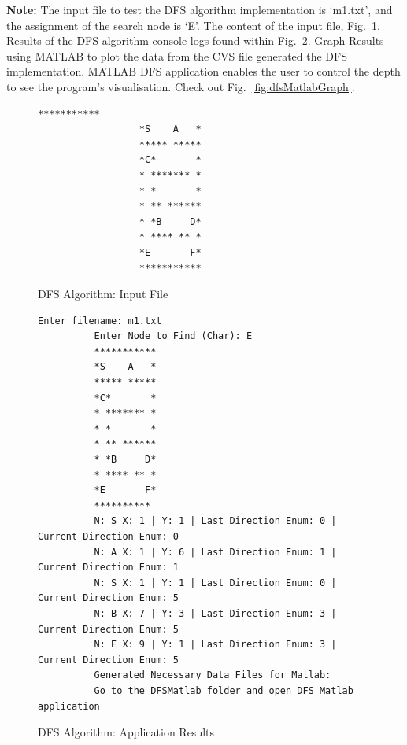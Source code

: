 \documentclass[conference]{IEEEtran}
\begin{document}
      \textbf{Note:} The input file to test the DFS algorithm implementation is ‘m1.txt’, and the assignment of the search node is ‘E’. The content of the input file, Fig.~\ref{lstlisting:dfsInput}. Results of the DFS algorithm console logs found within Fig.~\ref{lstlisting:dfsApplicationResults}. Graph Results using MATLAB to plot the data from the CVS file generated the DFS implementation. MATLAB DFS application enables the user to control the depth to see the program's visualisation. Check out Fig.~\ref{fig:dfsMatlabGraph}.
      \begin{figure}[h]
        \begin{lstlisting}[columns=fixed]
                  ***********
                  *S    A   *
                  ***** *****
                  *C*       *
                  * ******* *
                  * *       *
                  * ** ******
                  * *B     D*
                  * **** ** *
                  *E       F*
                  ***********
        \end{lstlisting}
        \caption{DFS Algorithm: Input File}
        \label{lstlisting:dfsInput}
      \end{figure}

      \begin{figure}[ht]
        \begin{lstlisting}[columns=fixed]
          Enter filename: m1.txt
          Enter Node to Find (Char): E
          ***********
          *S    A   *
          ***** *****
          *C*       *
          * ******* *
          * *       *
          * ** ******
          * *B     D*
          * **** ** *
          *E       F*
          **********
          N: S X: 1 | Y: 1 | Last Direction Enum: 0 | Current Direction Enum: 0
          N: A X: 1 | Y: 6 | Last Direction Enum: 1 | Current Direction Enum: 1
          N: S X: 1 | Y: 1 | Last Direction Enum: 0 | Current Direction Enum: 5
          N: B X: 7 | Y: 3 | Last Direction Enum: 3 | Current Direction Enum: 5
          N: E X: 9 | Y: 1 | Last Direction Enum: 3 | Current Direction Enum: 5
          Generated Necessary Data Files for Matlab:
          Go to the DFSMatlab folder and open DFS Matlab application
        \end{lstlisting}
        \caption{DFS Algorithm: Application Results}
        \label{lstlisting:dfsApplicationResults}
      \end{figure}
\end{document}
